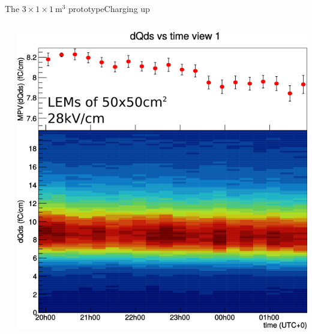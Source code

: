 \documentclass[10pt]{beamer}
\begin{document}
\begin{frame}{The \texorpdfstring{$3 \times 1 \times \SI{1}{\meter\cubed}$}{311} prototype}{Charging up}
\begin{scriptsize}
\begin{columns}
\begin{column}{0.45\textwidth}
    			\end{column}\hfill
    			\begin{column}{0.55\textwidth}
    				\centering \includegraphics[width=\textwidth]{figures/311/311_charging_up.png}\\
    				\vfill
    			\end{column}
    		\end{columns}
    	\end{scriptsize}
    \end{frame}
    
\end{document}
